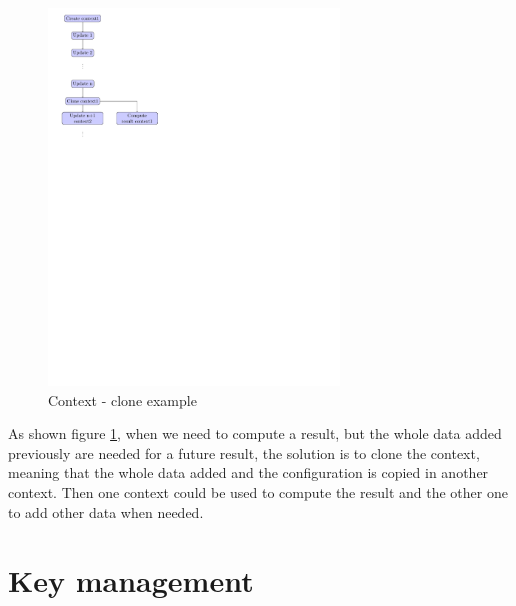 \begin{figure}[!ht]
\centering
\includegraphics[trim=0cm 18.5cm 9.5cm 0cm,
height=10cm]{figures/hash_signature_clone.pdf}
\caption{Context - clone example\newline}
\label{fig:gci_clone}
\end{figure}
As shown figure \ref{fig:gci_clone}, when we need to compute a result, but the
whole data added previously are needed for a future result, the solution is to clone the context, meaning that the whole
data added and the configuration is copied in another context.\newline
Then one context could be used to compute the result and the other one
to add other data when needed.\newline
{}
\newpage
\section{Key management}
\label{gci_key_mng}
